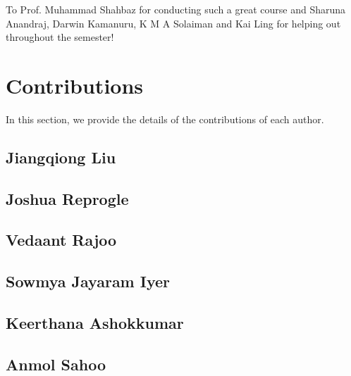 \documentclass[sigconf]{acmart}
\begin{document}
%
\begin{acks}
    To Prof. Muhammad Shahbaz for conducting such a great course and Sharuna
    Anandraj, Darwin Kamanuru, K M A Solaiman and Kai Ling for helping out
    throughout the semester!
\end{acks}





\appendix

\section{Contributions}

In this section, we provide the details of the contributions of each author.

\subsection{Jiangqiong Liu}

\subsection{Joshua Reprogle}

\subsection{Vedaant Rajoo}

\subsection{Sowmya Jayaram Iyer}

\subsection{Keerthana Ashokkumar}

\subsection{Anmol Sahoo}
\end{document}
